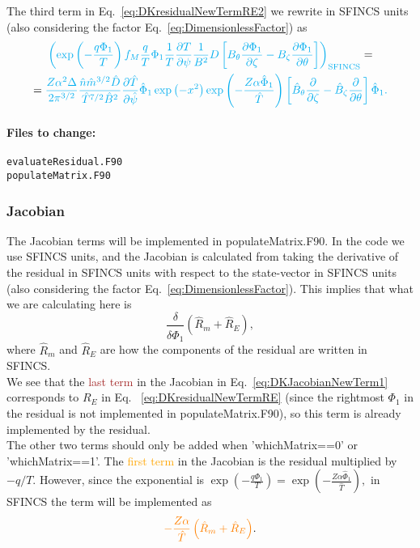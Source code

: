 \documentclass[12pt]{article}
\newcommand{\p}{\partial}
\newcommand{\remark}[1]{\textbf{\textcolor{red}{REMARK: #1}}}
\begin{document}
The third term in Eq.~\ref{eq:DKresidualNewTermRE2} we rewrite in SFINCS units (also considering the factor Eq.~\ref{eq:DimensionlessFactor}) as
\begin{multline}
\textcolor{cyan}{
\left(\exp \left(- \frac{q \Phi_1}{T}  \right) f_{M} \frac{q}{T} \Phi_1 \frac{1}{T} \frac{\p T}{\p \psi} \frac{1}{B^2} D \left[B_\theta \frac{\p \Phi_1}{\p \zeta} - B_\zeta \frac{\p \Phi_1}{\p \theta}\right]\right)_{\mathrm{SFINCS}}} = \\ = \textcolor{cyan}{
\frac{Z \alpha^2 \Delta}{2 \pi^{3/2}} \frac{\hat{n} \hat{m}^{3/2} \hat{D}}{\hat{T}^{7/2} \hat{B}^2 } \frac{\p \hat{T}}{\p \hat{\psi}} \hat{\Phi}_1
\exp\left(-x^2\right) \exp \left(- \frac{Z \alpha \hat{\Phi}_1}{\hat{T}}\right) \left[\hat{B}_{\theta} \frac{\p}{\p \zeta} - \hat{B}_{\zeta} \frac{\p}{\p \theta}\right] \hat{\Phi}_1.
}
\label{eq:REterm3}
\end{multline}

\paragraph*{\textbf{Files to change:}}
\begin{verbatim}
evaluateResidual.F90
populateMatrix.F90
\end{verbatim}


\subsubsection*{Jacobian}
The Jacobian terms will be implemented in populateMatrix.F90. 
In the code we use SFINCS units, and the Jacobian is calculated from taking the derivative of the residual in SFINCS units with respect to the state-vector in SFINCS units (also considering the factor Eq.~\ref{eq:DimensionlessFactor}). This implies that what we are calculating here is 
\[
\frac{\delta}{\delta \hat{\Phi}_1} \left(\hat{R}_m + \hat{R}_E\right),
\]
where $\hat{R}_m$ and $\hat{R}_E$ are how the components of the residual are written in SFINCS. \\
We see that the \textcolor{brown}{last term} in the Jacobian in Eq.~\ref{eq:DKJacobianNewTerm1} corresponds to $R_E$ in Eq.~ \ref{eq:DKresidualNewTermRE} (since the rightmost $\Phi_1$ in the residual is not implemented in populateMatrix.F90), 
so this term is already implemented by the residual.\\

\noindent The other two terms should only be added when 'whichMatrix==0' or 'whichMatrix==1'. 
The \textcolor{orange}{first term} in the Jacobian is the residual multiplied by $- q / T$. However, since the exponential is 
$ \displaystyle
\exp \left(- \frac{q \Phi_1}{T}  \right) = \exp \left(- \frac{Z \alpha \hat{\Phi}_1}{\hat{T}}  \right), 
$
in SFINCS the term will be implemented as 
\begin{equation}
  \label{eq:JacobianFirstTerm1}
  \textcolor{orange}{- \frac{Z \alpha}{\hat{T}}  \left(\hat{R}_m + \hat{R}_E\right)}.
\end{equation}
\end{document}
